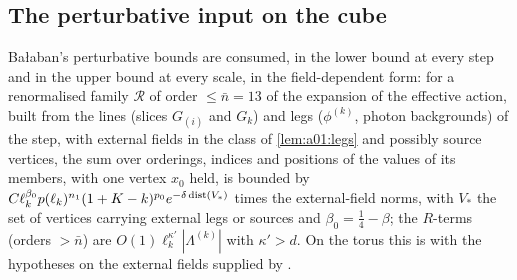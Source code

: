 \subsection{The perturbative input on the cube}\label{app:a01:TD}

Ba{\l}aban's perturbative bounds \cite[Prop.~1]{Ba3} are consumed, in the lower bound at every step and in the upper bound at every scale, in the field-dependent form: for a renormalised family $\mathcal R$ of order $\le\bar n=13$ of the expansion of the effective action, built from the lines (slices $G_{(i)}$ and $G_k$) and legs ($\phi^{(k)}$, photon backgrounds) of the step, with external fields in the class of \cref{lem:a01:legs} and possibly source vertices, the sum over orderings, indices and positions of the values of its members, with one vertex $x_0$ held, is bounded by $C\ell_k^{\beta_0}p(\ell_k)^{n_1}(1+K-k)^{p_0}e^{-\delta\operatorname{dist}(V_*)}$ times the external-field norms, with $V_*$ the set of vertices carrying external legs or sources and $\beta_0=\frac14-\beta$; the $R$-terms (orders $>\bar n$) are $O(1)\ell_k^{\kappa'}|\Lambda^{(k)}|$ with $\kappa'>d$. On the torus this is \cite[Prop.~1]{Ba3} with the hypotheses on the external fields supplied by \cite[Lemma~2.4]{Ba2}.

